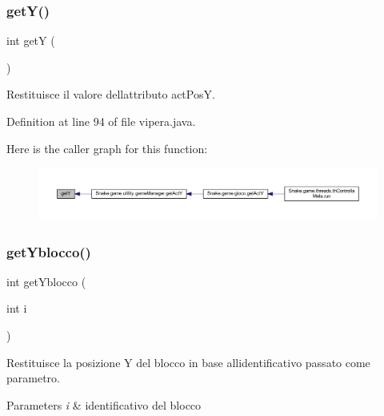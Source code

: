 \subsubsection{\texorpdfstring{get\+Y()}{getY()}}
{\footnotesize\ttfamily int getY (\begin{DoxyParamCaption}{ }\end{DoxyParamCaption})}



Restituisce il valore dell\textquotesingle{}attributo act\+PosY. 



Definition at line 94 of file vipera.\+java.

Here is the caller graph for this function\+:
\nopagebreak
\begin{figure}[H]
\begin{center}
\leavevmode
\includegraphics[width=350pt]{class_snake_1_1game_1_1vipera_1_1vipera_aab81944f0a14bba932c0931899951937_icgraph}
\end{center}
\end{figure}
\mbox{\label{class_snake_1_1game_1_1vipera_1_1vipera_a4fad016a4b1de9e17b7092abd420d962}} 
\subsubsection{\texorpdfstring{get\+Yblocco()}{getYblocco()}}
{\footnotesize\ttfamily int get\+Yblocco (\begin{DoxyParamCaption}\item[{int}]{i }\end{DoxyParamCaption})}



Restituisce la posizione Y del blocco in base all\textquotesingle{}identificativo passato come parametro. 


\begin{DoxyParams}{Parameters}
{\em i} & identificativo del blocco \\
\hline
\end{DoxyParams}


